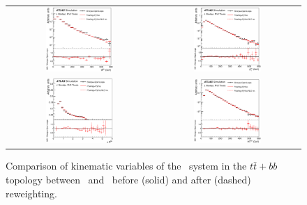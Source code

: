 \begin{figure}[p]
\begin{center}
\begin{tabular}{cc}
\includegraphics[width=0.48\textwidth]{Modeling/Figures/rw_ttbb_qq_m.eps} &
\includegraphics[width=0.48\textwidth]{Modeling/Figures/rw_ttbb_qq_pt.eps} \\
\includegraphics[width=0.48\textwidth]{Modeling/Figures/rw_ttbb_qq_dr.eps} &
\includegraphics[width=0.48\textwidth]{Modeling/Figures/rw_ttbb_qq_ht.eps} \\
\end{tabular}
\caption{Comparison of kinematic variables of the \bbbar\ system in the $t\bar{t}+bb$ topology between \ShOL\ and \PP\ before (solid) and after (dashed) reweighting.}
\label{fig:default_tt2b_bb_rw}
\end{center}
\end{figure}

